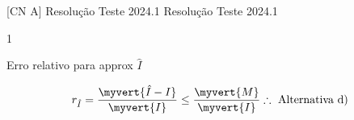 \documentclass["CN_A-Tests_Resolutions.tex"]{subfiles}
\begin{document}

[CN A]
{Resolução Teste 2024.1} %
{Resolução Teste 2024.1} %

\begin{questionBox}1{} %

  Erro relativo para approx \(\hat{I}\)

  \answer{}

  \begin{gather*}
      r_{\hat{I}}
      = \frac{\myvert{\hat{I}-I}}{\myvert{I}}
      \leq \frac{\myvert{M}}{\myvert{I}}
      \therefore\text{ Alternativa d)}
    \end{gather*}

\end{questionBox}
\end{document}
